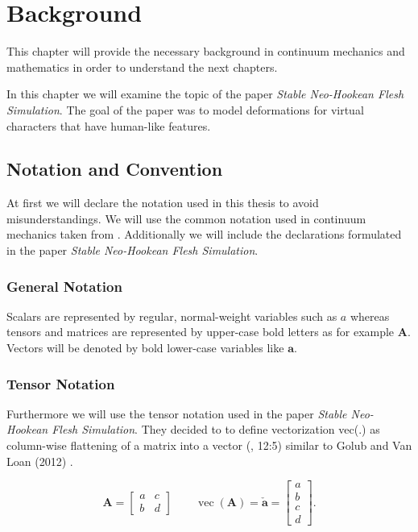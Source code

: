 \chapter{Background} \label{c:Background}
This chapter will provide the necessary background in continuum mechanics and mathematics in order to understand the next chapters.

In this chapter we will examine the topic of the paper \textit{Stable Neo-Hookean Flesh Simulation}. The goal of the paper was to model deformations for virtual characters that have human-like features.


\section{Notation and Convention}
At first we will declare the notation used in this thesis to avoid misunderstandings. We will use the common notation used in continuum mechanics taken from \cite{Spencer1980}. Additionally we will include the declarations formulated in the paper \textit{Stable Neo-Hookean Flesh Simulation}. 

\subsection{General Notation}
Scalars are represented by regular, normal-weight variables such as $a$ whereas 
tensors and matrices are represented by upper-case bold letters as for example $\textbf{A}$. Vectors will be denoted by bold lower-case variables like $\textbf{a}$. 


\subsection{Tensor Notation}
Furthermore we will use the tensor notation used in the paper \textit{Stable Neo-Hookean Flesh Simulation}. They decided to to define vectorization vec(.) as column-wise flattening of a matrix into a vector (\cite{Smith:2018:SNF:3191713.3180491}, 12:5) similar to Golub and Van Loan (2012) \cite{golub2012matrix}.

\[
\textbf{A} = \begin{bmatrix} a & c \\ b & d \end{bmatrix} \qquad \operatorname{vec}(\textbf{A}) = \boldsymbol{\check{a}} = \begin{bmatrix} a \\ b \\ c \\ d \end{bmatrix}.
\]

